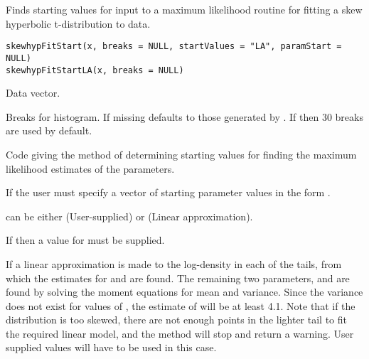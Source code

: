\begin{Description}\relax
Finds starting values for input to a maximum likelihood routine for
fitting a skew hyperbolic t-distribution to data.
\end{Description}
\begin{Usage}
\begin{verbatim}
skewhypFitStart(x, breaks = NULL, startValues = "LA", paramStart = NULL)
skewhypFitStartLA(x, breaks = NULL)
\end{verbatim}
\end{Usage}
\begin{Arguments}
\begin{ldescription}
\item[\code{x}] Data vector.
\item[\code{breaks}] Breaks for histogram. If missing defaults to those
generated by . If
 then 30 breaks are used by default.
\item[\code{startValues}] Code giving the method of determining starting
values for finding the maximum likelihood estimates of the
parameters.
\item[\code{paramStart}] If  the user must specify a
vector of starting parameter values in the form .
\end{ldescription}
\end{Arguments}
\begin{Details}\relax
{} can be either (User-supplied) or
 (Linear approximation).

If  then a value for  must be
supplied.

If  a linear approximation is made to the
log-density in each of the tails, from which the estimates for
\eqn{\nu}{} and \eqn{\beta}{} are found. The remaining two
parameters, \eqn{\delta}{} and \eqn{\mu}{} are found by solving
the moment equations for mean and variance.
Since the variance does not exist for values of , the estimate of \eqn{\nu}{} will be at least 4.1.
Note that if the distribution is too skewed, there are not enough
points in the lighter tail to fit the required linear model, and the
method will stop and return a warning. User supplied values will have
to be used in this case.
\end{Details}
